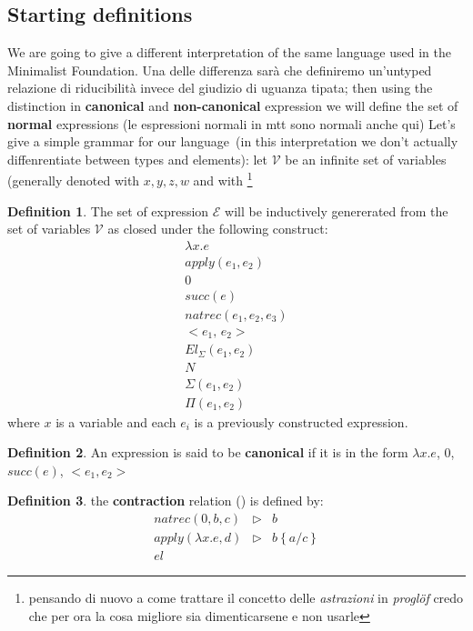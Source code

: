 \documentclass[11pt,a5paper,draft,oneside]{amsbook}
\theoremstyle{plain}%
\theoremstyle{definition}
\newtheorem{dede}{Definition}[section]
\theoremstyle{remark}
\newcommand{\Va}{\mathcal{V}}
\newcommand{\Ve}{\mathcal{E}}
\newcommand{\cp}[1][\cdot,\cdot]{<#1>}
\newcommand{\ctr}{\triangleright}
\newcommand{\sbs}[3]{#1\left\lbrace #2 / #3 \right\rbrace}
\newcommand{\femph}{\textbf}
\begin{document}
	\subsection{Starting definitions}
		We are going to give a different interpretation 
		of the same language used in the Minimalist 
		Foundation. Una delle differenza sarà che definiremo
		un'untyped relazione di riducibilità invece 
		del giudizio di uguanza tipata; then using the distinction in \femph{canonical} and \femph{non-canonical} expression we will define the set of \femph{normal} expressions (le espressioni normali in mtt sono normali anche qui)
		Let's give a simple grammar for our language~(in this interpretation we don't actually diffenrentiate between types and elements): let $\Va$ be an infinite set of variables (generally denoted with $x,y,z,w$ and with \footnote{pensando di nuovo a come trattare il concetto delle \emph{astrazioni} in \textsl{proglöf} credo che per ora la cosa migliore sia dimenticarsene e non usarle}		
\begin{dede}
	The set of expression $\Ve$ will be inductively genererated from the set of variables $\Va$ as closed under the following construct:
	\begin{gather}
	 \lambda x.e \\
	 apply(e_1,e_2) \\
	 0 \\ 
	 succ(e) \\ 
	 natrec(e_1,e_2,e_3) \\ 
	 \cp[e_1,\,e_2] \\
	 El_\Sigma(e_1, e_2) \\
	 N 		\\
	 \Sigma(e_1,e_2)\\
	 \Pi(e_1,e_2)
	\end{gather}
	where $x$ is a variable and each $e_i$ is a previously constructed expression.
	\end{dede}
	\begin{dede}
		An expression is said to be \femph{canonical} if it is in the form $\lambda x.e$, 0, $succ(e)$, $\cp[e_1,e_2]$ 
	\end{dede}
	
	\begin{dede}
		the \femph{contraction} relation (\triangleright)
		is defined by:
		\begin{align}
		natrec(0, b, c) & \ctr & b \\
		apply(\lambda x.e, d) & \ctr & \sbs{b}{a}{c}\\
		el
		\end{align}			
	\end{dede}
	
\end{document}
